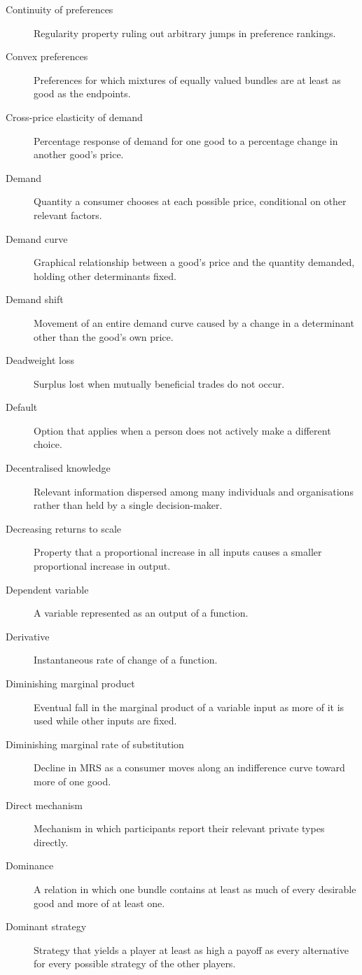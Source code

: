 \begin{description}
  \item[Continuity of preferences] Regularity property ruling out arbitrary jumps in preference rankings.
  \item[Convex preferences] Preferences for which mixtures of equally valued bundles are at least as good as the endpoints.
  \item[Cross-price elasticity of demand] Percentage response of demand for one good to a percentage change in another good's price.
  \item[Demand] Quantity a consumer chooses at each possible price, conditional on other relevant factors.
  \item[Demand curve] Graphical relationship between a good's price and the quantity demanded, holding other determinants fixed.
  \item[Demand shift] Movement of an entire demand curve caused by a change in a determinant other than the good's own price.
  \item[Deadweight loss] Surplus lost when mutually beneficial trades do not occur.
  \item[Default] Option that applies when a person does not actively make a different choice.
  \item[Decentralised knowledge] Relevant information dispersed among many individuals and organisations rather than held by a single decision-maker.
  \item[Decreasing returns to scale] Property that a proportional increase in all inputs causes a smaller proportional increase in output.
  \item[Dependent variable] A variable represented as an output of a function.
  \item[Derivative] Instantaneous rate of change of a function.
  \item[Diminishing marginal product] Eventual fall in the marginal product of
  a variable input as more of it is used while other inputs are fixed.
  \item[Diminishing marginal rate of substitution] Decline in MRS as a consumer moves along an indifference curve toward more of one good.
  \item[Direct mechanism] Mechanism in which participants report their relevant private types directly.
  \item[Dominance] A relation in which one bundle contains at least as much of every desirable good and more of at least one.
  \item[Dominant strategy] Strategy that yields a player at least as high a payoff as every alternative for every possible strategy of the other players.

\end{description}

